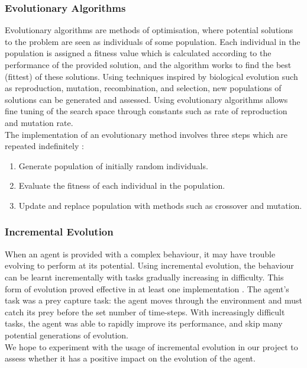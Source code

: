 \documentclass[11pt,a4paper]{article}
\begin{document}
\subsubsection{Evolutionary Algorithms}
Evolutionary algorithms are methods of optimisation, where potential solutions to the problem are seen as individuals of some population. Each individual in the population is assigned a fitness value which is calculated according to the performance of the provided solution, and the algorithm works to find the best (fittest) of these solutions. Using techniques inspired by biological evolution such as reproduction, mutation, recombination, and selection, new populations of solutions can be generated and assessed. Using evolutionary algorithms allows fine tuning of the search space through constants such as rate of reproduction and mutation rate. \cite{gas}\\

The implementation of an evolutionary method involves three steps which are repeated indefinitely \cite{ea}:
\begin{enumerate}
\item Generate population of initially random individuals.
\item Evaluate the fitness of each individual in the population.
\item Update and replace population with methods such as crossover and mutation.
\end{enumerate}
\newpage
\subsubsection{Incremental Evolution}
When an agent is provided with a complex behaviour, it may have trouble evolving to perform at its potential. Using incremental evolution, the behaviour can be learnt incrementally with tasks gradually increasing in difficulty. This form of evolution proved effective in at least one implementation \cite{incre}. The agent's task was a prey capture task: the agent moves through the environment and must catch its prey before the set number of time-steps. With increasingly difficult tasks, the agent was able to rapidly improve its performance, and skip many potential generations of evolution.\\

We hope to experiment with the usage of incremental evolution in our project to assess whether it has a positive impact on the evolution of the agent.\vspace{10mm}
\end{document}
